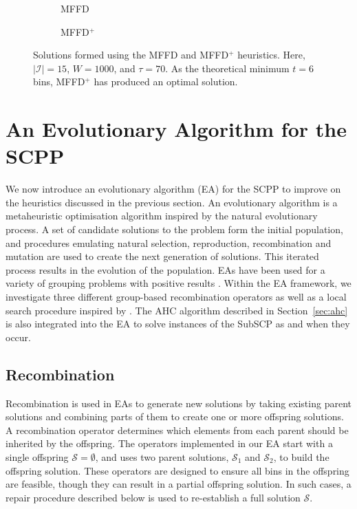 \documentclass[authoryear]{elsarticle}
\begin{document}
\begin{figure}[H]	
	\centering
	\begin{subfigure}[h]{0.33\textwidth}
		
		\caption{MFFD}
		\label{fig:mffd}
	\end{subfigure} \hspace{15mm}
	\begin{subfigure}[h]{0.33\textwidth}
		
		\caption{MFFD$^+$}
		\label{fig:mffdplus}
	\end{subfigure}
	\caption{Solutions formed using the MFFD and MFFD$^+$ heuristics. Here, $|\mathcal{I}| = 15$, $W = 1000$, and $\tau = 70$. As the theoretical minimum $t = 6$ bins, MFFD$^+$ has produced an optimal solution.}
	\label{fig:mffdvsmffdplus}
\end{figure}

\section{An Evolutionary Algorithm for the SCPP}
\label{sec:ea}
\noindent We now introduce an evolutionary algorithm (EA) for the SCPP to improve on the heuristics discussed in the previous section. An evolutionary algorithm is a metaheuristic optimisation algorithm inspired by the natural evolutionary process. A set of candidate solutions to the problem form the initial population, and procedures emulating natural selection, reproduction, recombination and mutation are used to create the next generation of solutions. This iterated process results in the evolution of the population. EAs have been used for a variety of grouping problems with positive results \citep{lewis2017, falkenauer1996, quiroz2015}. Within the EA framework, we investigate three different group-based recombination operators as well as a local search procedure inspired by \citet{martello1990l}. The AHC algorithm described in Section~\ref{sec:ahc} is also integrated into the EA to solve instances of the SubSCP as and when they occur.

\subsection{Recombination}
\label{sub:recomb}
\noindent Recombination is used in EAs to generate new solutions by taking existing parent solutions and combining parts of them to create one or more offspring solutions. A recombination operator determines which elements from each parent should be inherited by the offspring. The operators implemented in our EA start with a single offspring $\mathcal{S} = \emptyset$, and uses two parent solutions, $\mathcal{S}_1$ and $\mathcal{S}_2$, to build the offspring solution. These operators are designed to ensure all bins in the offspring are feasible, though they can result in a partial offspring solution. In such cases, a repair procedure described below is used to re-establish a full solution $\mathcal{S}$.
\end{document}
